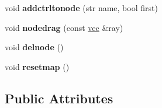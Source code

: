 \begin{DoxyCompactItemize}
void {\bfseries addctrltonode} (str name, bool first)
\item 
\mbox{\label{structworld_ab1f926ffd5d56692c138d2d0d15ad826}} 
void {\bfseries nodedrag} (const \hyperlink{structvec}{vec} \&ray)
\item 
\mbox{\label{structworld_a8a7d798655142b2500ceeca1e8f43d33}} 
void {\bfseries delnode} ()
\item 
\mbox{\label{structworld_afb9bc78f7d083c71760595e8e863d1ce}} 
void {\bfseries resetmap} ()
\end{DoxyCompactItemize}
\subsection*{Public Attributes}
